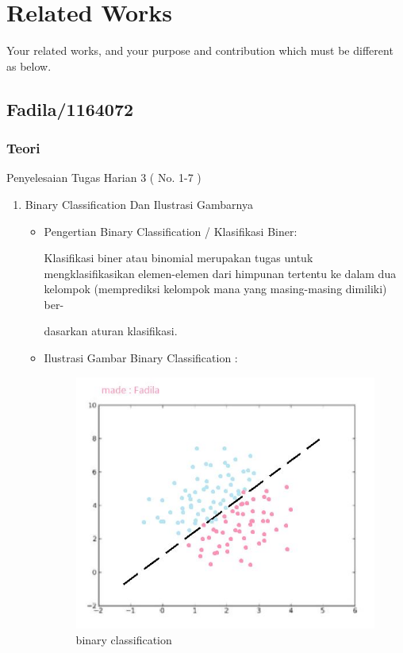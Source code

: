 \chapter{Related Works}

Your related works, and your purpose and contribution which must be different as below.

\section{Fadila/1164072}
\subsection{Teori}
Penyelesaian Tugas Harian 3 ( No. 1-7 )
\begin{enumerate}
\item Binary Classification Dan Ilustrasi Gambarnya
\begin{itemize}
\item Pengertian Binary Classification / Klasifikasi Biner:
\par Klasifikasi biner atau binomial merupakan tugas untuk mengklasifikasikan elemen-elemen dari himpunan tertentu ke dalam dua kelompok (memprediksi kelompok mana yang masing-masing dimiliki) ber-
\par dasarkan aturan klasifikasi.
\item Ilustrasi Gambar Binary Classification :
\par

\begin{figure}[ht]
\centering
\includegraphics[scale=0.3]{figures/binary.jpg}
\caption{binary classification}
\label{contoh}
\end{figure}


\end{itemize}
\end{enumerate}
